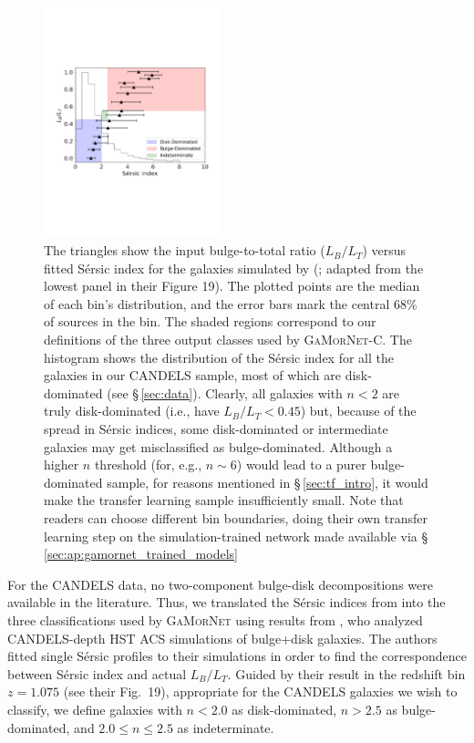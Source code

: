 \documentclass[twocolumn]{aastex63}
\newcommand\sersic{S\'ersic}
\newcommand\gamornet{G\textsc{a}M\textsc{or}N\textsc{et}}
\begin{document}
\begin{figure}[hbt]
    \centering
    \includegraphics[width=0.46\textwidth]{btr_si.pdf}
    \caption{ The triangles show the input bulge-to-total ratio ($L_B/L_T$) versus fitted \sersic{} index for the galaxies simulated by \citeauthor{simmons_08} (\citeyear{simmons_08}; adapted from the lowest panel in their Figure 19). The plotted points are the median of each bin's distribution, and the error bars mark the central 68\% of sources in the bin. The shaded regions correspond to our definitions of the three output classes used by \gamornet{}-C. The histogram shows the distribution of the \sersic{} index for all the galaxies in our CANDELS sample, most of which are disk-dominated (see \S\,\ref{sec:data}). Clearly, all galaxies with $n<2$ are truly disk-dominated (i.e., have $L_B/L_T < 0.45$) but, because of the spread in \sersic{} indices, some disk-dominated or intermediate galaxies may get misclassified as bulge-dominated. Although a higher $n$ threshold (for, e.g., $n \sim 6$) would lead to a purer bulge-dominated sample, for reasons mentioned in \S\,\ref{sec:tf_intro}, it would make the transfer learning sample insufficiently small. Note that readers can choose different bin boundaries, doing their own transfer learning step on the simulation-trained network made available via \S\,\ref{sec:ap:gamornet_trained_models}}
    \label{fig:si_lb_lt}
\end{figure}{}
    
For the CANDELS data, no two-component bulge-disk decompositions were available in the literature. Thus, we translated the \sersic{} indices from \citet{vdw_12} into the three classifications used by \gamornet{} using results from \citet{simmons_08}, who analyzed CANDELS-depth HST ACS simulations of bulge+disk galaxies. The authors fitted single \sersic{} profiles to their simulations in order to find the correspondence between \sersic{} index and actual $L_B/L_T$. Guided by their result in the redshift bin $z=1.075$ (see their Fig.~19), appropriate for the CANDELS galaxies we wish to classify, we define galaxies with $n < 2.0$ as disk-dominated, $n > 2.5$ as bulge-dominated, and $ 2.0 \leq n \leq 2.5$ as indeterminate.
    
\end{document}
